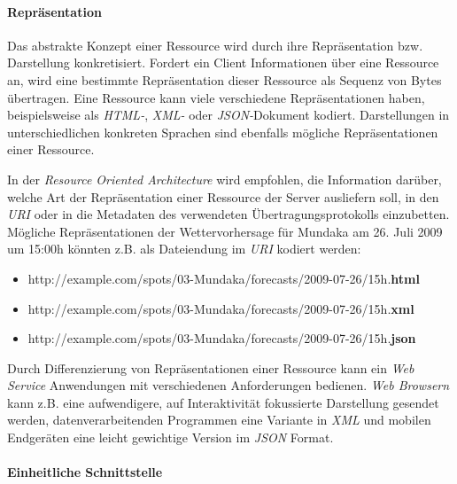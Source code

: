 \paragraph{Repräsentation}
Das abstrakte Konzept einer Ressource wird durch ihre Repräsentation
bzw. Darstellung konkretisiert. Fordert ein Client Informationen über
eine Ressource an, wird eine bestimmte Repräsentation dieser Ressource
als Sequenz von Bytes übertragen. Eine Ressource kann viele
verschiedene Repräsentationen haben, beispielsweise als
\textit{HTML-}, 
\textit{XML-} oder \textit{JSON-}Dokument
 kodiert. Darstellungen
in unterschiedlichen konkreten Sprachen sind ebenfalls mögliche
Repräsentationen einer Ressource.

In der \textit{Resource Oriented Architecture} wird empfohlen, die
Information darüber, welche Art der Repräsentation einer Ressource der
Server ausliefern soll, in den \textit{URI} oder in die Metadaten des
verwendeten Übertragungsprotokolls einzubetten. Mögliche
Repräsentationen der Wettervorhersage für Mundaka am 26. Juli 2009 um
15:00h könnten z.B. als Dateiendung im \textit{URI} kodiert werden:

{\sf \small
  \begin{itemize}
  \item http://example.com/spots/03-Mundaka/forecasts/2009-07-26/15h.\textbf{html}
  \item http://example.com/spots/03-Mundaka/forecasts/2009-07-26/15h.\textbf{xml}
  \item http://example.com/spots/03-Mundaka/forecasts/2009-07-26/15h.\textbf{json}
  \end{itemize}
}

Durch Differenzierung von Repräsentationen einer Ressource kann ein
\textit{Web Service} Anwendungen mit verschiedenen Anforderungen
bedienen. \textit{Web Browsern} kann z.B. eine aufwendigere, auf
Interaktivität fokussierte Darstellung gesendet werden,
datenverarbeitenden Programmen eine Variante in \textit{XML} und
mobilen Endgeräten eine leicht gewichtige Version im \textit{JSON}
Format.

\paragraph{Einheitliche Schnittstelle}


